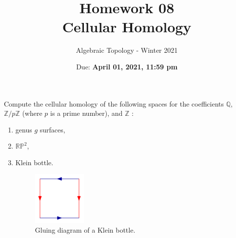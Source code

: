 \documentclass{article}
\title{Homework 08 \\ Cellular Homology}
\author{Algebraic Topology - Winter 2021}
\date{Due: \textbf{April 01, 2021, 11:59 pm}}
\begin{document}
\maketitle

Compute the cellular homology of the following spaces for the coefficients $\mathbb{Q}$, $\mathbb{Z}/p\mathbb{Z}$ (where $p$ is a prime number), and $\mathbb{Z}$ :
\begin{enumerate}
    \item genus $g$ surfaces,
    \item $\mathbb{RP}^2$,
    \item Klein bottle.
    \begin{figure}[H]
        \centering \includegraphics[width=100px]{images/klein-bottle.png}
        \caption{Gluing diagram of a Klein bottle.}
    \end{figure}
\end{enumerate} 
\end{document}
